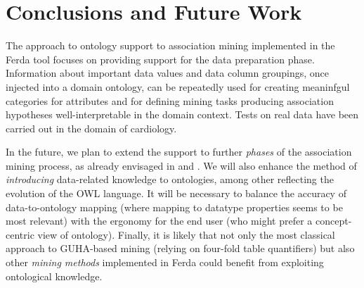 \section{Conclusions and Future Work} \label{Conclusions}

The approach to ontology support to association mining implemented in the Ferda tool focuses on providing support for the data preparation phase.
Information about important data values and data column groupings, once injected into a domain ontology, can be repeatedly used for creating meaninfgul categories for attributes and for defining mining tasks producing association hypotheses well-interpretable in the domain context.
Tests on real data have been carried out in the domain of cardiology.

In the future, we plan to extend the support to further \emph{phases} of the association mining process, as already envisaged in \cite{Ralbovsky} and \cite{Ontology}.
We will also enhance the method of \emph{introducing} data-related knowledge to ontologies, among other reflecting the evolution of the OWL language.
It will be necessary to balance the accuracy of data-to-ontology mapping (where mapping to datatype properties seems to be most relevant) with the ergonomy for the end user (who might prefer a concept-centric view of ontology).
Finally, it is likely that not only the most classical approach to GUHA-based mining (relying on four-fold table quantifiers) but also other \emph{mining methods} implemented in Ferda could benefit from exploiting ontological knowledge.